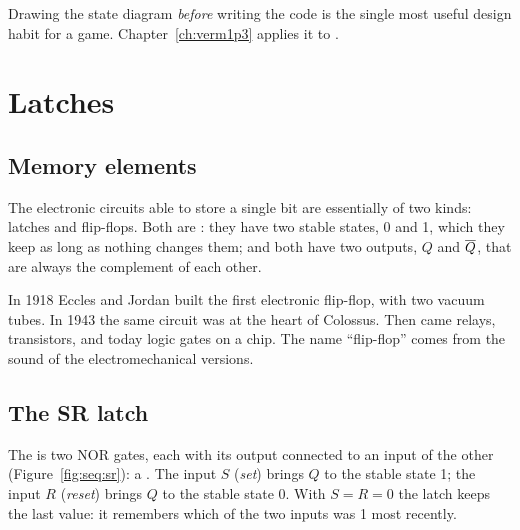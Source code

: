 \begin{prgconcept}
Drawing the state diagram \emph{before} writing the code is the single most
useful design habit for a game. Chapter~\ref{ch:verm1p3} applies it to
\vermone.
\end{prgconcept}

\section{Latches}

\subsection{Memory elements}

The electronic circuits able to store a single bit are essentially of two
kinds: latches and flip-flops. Both are : they have two stable
states, 0 and 1, which they keep as long as nothing changes them; and both
have two outputs, $Q$ and $\overline{Q}$, that are always the complement of each
other.

\begin{prgaside}
In 1918 Eccles and Jordan built the first electronic flip-flop, with two
vacuum tubes. In 1943 the same circuit was at the heart of Colossus. Then
came relays, transistors, and today logic gates on a chip. The name
``flip-flop'' comes from the sound of the electromechanical versions.
\end{prgaside}

\subsection{The SR latch}

The  is two NOR gates, each with its output connected to an
input of the other (Figure~\ref{fig:seq:sr}): a . The input
$S$ (\emph{set}) brings $Q$ to the stable state 1; the input $R$
(\emph{reset}) brings $Q$ to the stable state 0. With $S=R=0$ the latch keeps
the last value: it remembers which of the two inputs was 1 most recently.

